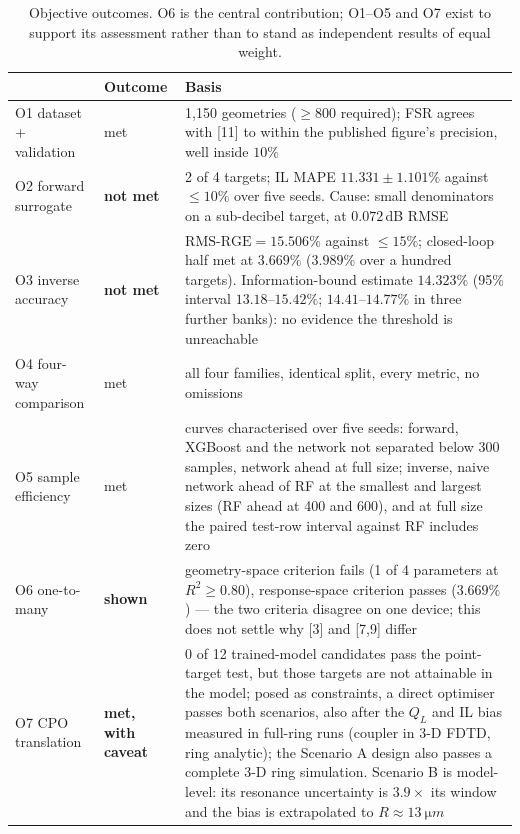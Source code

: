 \documentclass[11pt]{article}
\newcommand{\QL}{Q_L}
\newcommand{\rge}{\mathrm{RMS\text{-}RGE}}
\begin{document}
\begin{table}[!tbp]
\centering
\caption{Objective outcomes. O6 is the central contribution; O1--O5 and O7
exist to support its assessment rather than to stand as independent
results of equal weight.}
\label{tab:score}
\small
\begin{tabular}{@{}llp{7.4cm}@{}}
\toprule
& Outcome & Basis \\
\midrule
O1 dataset + validation & met & 1{,}150 geometries ($\ge 800$ required); FSR
agrees with [11] to within the published figure's precision, well inside
$10\%$ \\
O2 forward surrogate & \textbf{not met} & 2 of 4 targets; IL MAPE
$11.331 \pm 1.101\%$ against $\le 10\%$ over five seeds. Cause: small
denominators on a sub-decibel target, at $0.072$\,dB RMSE \\
O3 inverse accuracy & \textbf{not met} & $\rge = 15.506\%$ against
$\le 15\%$; closed-loop half met at $3.669\%$ ($3.989\%$ over a hundred targets). Information-bound estimate
$14.323\%$ (95\% interval $13.18$--$15.42\%$; $14.41$--$14.77\%$ in three further banks): no evidence the threshold is unreachable \\
O4 four-way comparison & met & all four families, identical split, every
metric, no omissions \\
O5 sample efficiency & met & curves characterised over five seeds: forward, XGBoost and the network not separated below 300 samples, network ahead at full size; inverse, naive network ahead of RF at the smallest and largest sizes (RF ahead at 400 and 600), and at full size the paired test-row interval against RF includes zero \\
O6 one-to-many & \textbf{shown} & geometry-space criterion fails (1 of 4
parameters at $R^2 \ge 0.80$), response-space criterion passes
($3.669\%$) --- the two criteria disagree on one device; this does not settle why [3] and [7,9] differ \\
O7 CPO translation & \textbf{met, with caveat} & 0 of 12 trained-model
candidates pass the point-target test, but those targets are not attainable in
the model; posed as constraints, a direct optimiser passes both scenarios,
also after the $\QL$ and IL bias measured in full-ring runs (coupler in 3-D FDTD, ring
analytic); the Scenario A design also passes a complete 3-D ring simulation. Scenario B is model-level: its resonance uncertainty is $3.9\times$ its window
and the bias is extrapolated to $R \approx \SI{13}{\micro m}$ \\
\bottomrule
\end{tabular}
\end{table}
\end{document}
